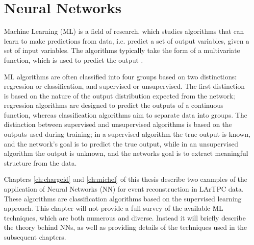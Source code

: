 \chapter{\label{ch:ml}Neural Networks} 

\minitoc

Machine Learning (ML) is a field of research, which studies algorithms that
can learn to make predictions from data, i.e. predict a set of output variables,
given a set of input variables. The algorithms typically take the form of a
multivariate function, which is used to predict the output \cite{Reed1999}.

ML algorithms are often classified into four groups based on two distinctions: 
regression or classification, and supervised or unsupervised. The first
distinction is based on the nature of the output distribution expected from the
network; regression algorithms are designed to predict the outputs of a 
continuous function, whereas classification algorithms aim to separate data 
into groups. The distinction between supervised and unsupervised algorithms is 
based on the outputs used during training; in a supervised algorithm the true 
output is known, and the network's goal is to predict the true output, while 
in an unsupervised algorithm the output is unknown, and the networks goal is 
to extract meaningful structure from the data\cite{Lecun2015}.

Chapters \ref{ch:chargeid} and \ref{ch:michel} of this thesis describe two 
examples of the application of Neural Networks (NN) for event reconstruction 
in LArTPC data. These algorithms are classification algorithms based on the
supervised learning approach. This chapter will not provide a full survey of
the available ML techniques, which are both numerous and diverse. Instead it 
will briefly describe the theory behind NNs, as well as providing details of 
the techniques used in the subsequent chapters. 

